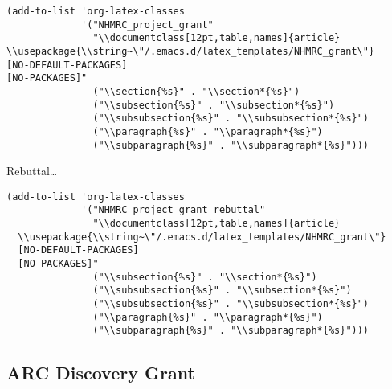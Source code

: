 \documentclass[12pt]{article}
\begin{document}
\lstset{language=Lisp,label= ,caption= ,captionpos=b,numbers=none}
\begin{lstlisting}
(add-to-list 'org-latex-classes
             '("NHMRC_project_grant"
               "\\documentclass[12pt,table,names]{article}
\\usepackage{\\string~\"/.emacs.d/latex_templates/NHMRC_grant\"}
[NO-DEFAULT-PACKAGES]
[NO-PACKAGES]"
               ("\\section{%s}" . "\\section*{%s}")
               ("\\subsection{%s}" . "\\subsection*{%s}")
               ("\\subsubsection{%s}" . "\\subsubsection*{%s}")
               ("\\paragraph{%s}" . "\\paragraph*{%s}")
               ("\\subparagraph{%s}" . "\\subparagraph*{%s}")))
\end{lstlisting}
Rebuttal\ldots{} 
\lstset{language=Lisp,label= ,caption= ,captionpos=b,numbers=none}
\begin{lstlisting}
(add-to-list 'org-latex-classes
             '("NHMRC_project_grant_rebuttal"
               "\\documentclass[12pt,table,names]{article}
  \\usepackage{\\string~\"/.emacs.d/latex_templates/NHMRC_grant\"}
  [NO-DEFAULT-PACKAGES]
  [NO-PACKAGES]"
               ("\\subsection{%s}" . "\\section*{%s}")
               ("\\subsubsection{%s}" . "\\subsection*{%s}")
               ("\\subsubsection{%s}" . "\\subsubsection*{%s}")
               ("\\paragraph{%s}" . "\\paragraph*{%s}")
               ("\\subparagraph{%s}" . "\\subparagraph*{%s}")))

\end{lstlisting}

\subsection{ARC Discovery Grant}
\label{sec:org93f855c}
\end{document}
